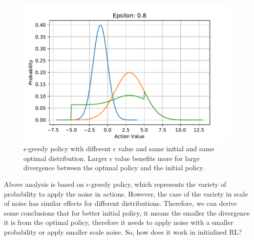 \documentclass{article}
\begin{document}
\begin{figure}[htbp]
	\includegraphics[scale=0.4]{img/noise28.pdf}
	\caption{$\epsilon$-greedy policy with different $\epsilon$ value and same initial and same optimal distribution. Larger $\epsilon$ value benefits more for large divergence between the optimal policy and the initial policy. }
	\label{fig:noise2}
\end{figure}
Above analysis is based on $\epsilon$-greedy policy, which represents the variety of probability to apply the noise in actions. However, the case of the variety in scale of noise has similar effects for different distributions. Therefore, we can derive some conclusions that for better initial policy, it means the smaller the divergence it is from the optimal policy, therefore it needs to apply noise with a smaller probability or apply smaller scale noise. So, how does it work in initialized RL?
\end{document}

